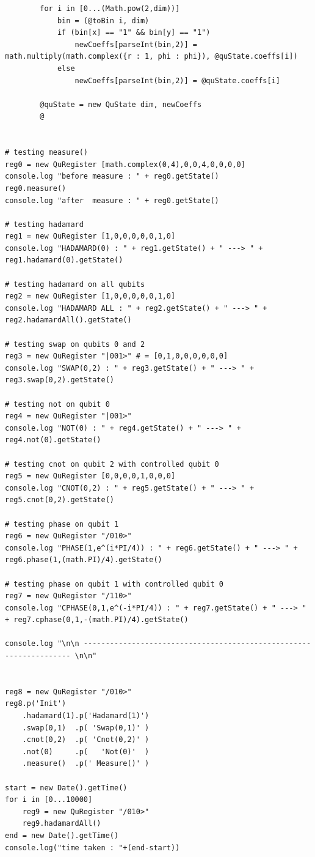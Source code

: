 \documentclass[a4paper,12pt]{report}
\begin{document}
\begin{lstlisting}
        for i in [0...(Math.pow(2,dim))]
            bin = (@toBin i, dim)
            if (bin[x] == "1" && bin[y] == "1")
                newCoeffs[parseInt(bin,2)] = math.multiply(math.complex({r : 1, phi : phi}), @quState.coeffs[i])
            else
                newCoeffs[parseInt(bin,2)] = @quState.coeffs[i]

        @quState = new QuState dim, newCoeffs
        @


# testing measure()
reg0 = new QuRegister [math.complex(0,4),0,0,4,0,0,0,0]
console.log "before measure : " + reg0.getState()
reg0.measure()
console.log "after  measure : " + reg0.getState()

# testing hadamard
reg1 = new QuRegister [1,0,0,0,0,0,1,0]
console.log "HADAMARD(0) : " + reg1.getState() + " ---> " + reg1.hadamard(0).getState()

# testing hadamard on all qubits
reg2 = new QuRegister [1,0,0,0,0,0,1,0]
console.log "HADAMARD ALL : " + reg2.getState() + " ---> " + reg2.hadamardAll().getState()

# testing swap on qubits 0 and 2
reg3 = new QuRegister "|001>" # = [0,1,0,0,0,0,0,0]
console.log "SWAP(0,2) : " + reg3.getState() + " ---> " + reg3.swap(0,2).getState()

# testing not on qubit 0
reg4 = new QuRegister "|001>"
console.log "NOT(0) : " + reg4.getState() + " ---> " + reg4.not(0).getState()

# testing cnot on qubit 2 with controlled qubit 0
reg5 = new QuRegister [0,0,0,0,1,0,0,0]
console.log "CNOT(0,2) : " + reg5.getState() + " ---> " + reg5.cnot(0,2).getState()

# testing phase on qubit 1
reg6 = new QuRegister "/010>"
console.log "PHASE(1,e^(i*PI/4)) : " + reg6.getState() + " ---> " + reg6.phase(1,(math.PI)/4).getState()

# testing phase on qubit 1 with controlled qubit 0
reg7 = new QuRegister "/110>"
console.log "CPHASE(0,1,e^(-i*PI/4)) : " + reg7.getState() + " ---> " + reg7.cphase(0,1,-(math.PI)/4).getState()

console.log "\n\n ------------------------------------------------------------------- \n\n"


reg8 = new QuRegister "/010>"
reg8.p('Init')
    .hadamard(1).p('Hadamard(1)')
    .swap(0,1)  .p( 'Swap(0,1)' )
    .cnot(0,2)  .p( 'Cnot(0,2)' )
    .not(0)     .p(   'Not(0)'  )
    .measure()  .p(' Measure()' )

start = new Date().getTime()
for i in [0...10000]
    reg9 = new QuRegister "/010>"
    reg9.hadamardAll()
end = new Date().getTime()
console.log("time taken : "+(end-start))
\end{lstlisting}
\end{document}
